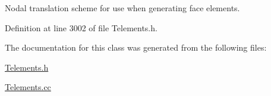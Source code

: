 Nodal translation scheme for use when generating face elements. 



Definition at line 3002 of file Telements.\+h.



The documentation for this class was generated from the following files\+:\begin{DoxyCompactItemize}
\item 
\hyperlink{Telements_8h}{Telements.\+h}\item 
\hyperlink{Telements_8cc}{Telements.\+cc}\end{DoxyCompactItemize}
